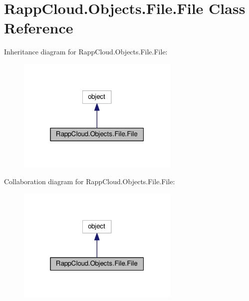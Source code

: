 \hypertarget{classRappCloud_1_1Objects_1_1File_1_1File}{\section{Rapp\-Cloud.\-Objects.\-File.\-File Class Reference}
\label{classRappCloud_1_1Objects_1_1File_1_1File}
}


Inheritance diagram for Rapp\-Cloud.\-Objects.\-File.\-File\-:
\nopagebreak
\begin{figure}[H]
\begin{center}
\leavevmode
\includegraphics[width=220pt]{classRappCloud_1_1Objects_1_1File_1_1File__inherit__graph}
\end{center}
\end{figure}


Collaboration diagram for Rapp\-Cloud.\-Objects.\-File.\-File\-:
\nopagebreak
\begin{figure}[H]
\begin{center}
\leavevmode
\includegraphics[width=220pt]{classRappCloud_1_1Objects_1_1File_1_1File__coll__graph}
\end{center}
\end{figure}

